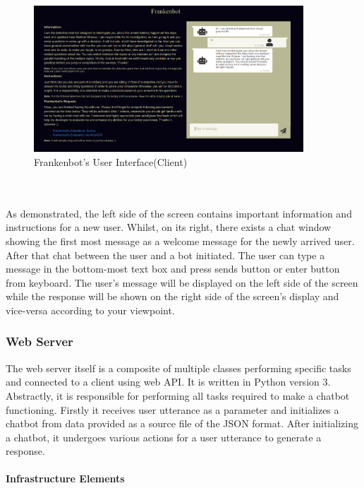 \begin{figure}[!h]
    \centering
    \includegraphics[width=0.9\textwidth]{img/User_Interface.PNG}
    \caption{Frankenbot's User Interface(Client)}
    \label{fig:userInter}
\end{figure}
\\~\\
As demonstrated, the left side of the screen contains important information and instructions for a new user. Whilst, on its right, there exists a chat window showing the first most message as a welcome message for the newly arrived user. After that chat between the user and a bot initiated. The user can type a message in the bottom-most text box and press sends button or enter button from keyboard. The user's message will be displayed on the left side of the screen while the response will be shown on the right side of the screen's display and vice-versa according to your viewpoint.

\subsubsection*{Web Server}
The web server itself is a composite of multiple classes performing specific tasks and connected to a client using web API. It is written in Python version 3. Abstractly, it is responsible for performing all tasks required to make a chatbot functioning. Firstly it receives user utterance as a parameter and initializes a chatbot from data provided as a source file of the JSON format. After initializing a chatbot, it undergoes various actions for a user utterance to generate a response.

\paragraph*{Infrastructure Elements}

